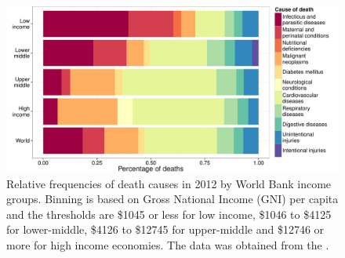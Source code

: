 \begin{knitrout}
\color{fgcolor}\begin{figure}
\includegraphics[width=\maxwidth]{figures/R/who-deaths/topCauses-who-deaths_top-causes-1} \caption[Relative frequencies of death causes in 2012 by World Bank income groups]{Relative frequencies of death causes in 2012 by World Bank income groups. Binning is based on Gross National Income (GNI) per capita and the thresholds are \$1045 or less for low income, \$1046 to \$4125 for lower-middle, \$4126 to \$12745 for upper-middle and \$12746 or more for high income economies. The data was obtained from the \cite{WHO2012}.}\label{fig:who-deaths_top-causes}
\end{figure}


\end{knitrout}

\newcommand{\knitrTotalDeathsTwelve}{58.3 million}

\newcommand{\knitrPercentageDeathsTwelveHigh}{20.1\%}
\newcommand{\knitrPercentageDeathsTwelveLow}{14\%}
\newcommand{\knitrPercentageDeathsTwelveLmid}{36.5\%}
\newcommand{\knitrPercentageDeathsTwelveUmid}{29.4\%}

\newcommand{\knitrPercentDeathsTwelveLowInfect}{39.6\%}
\newcommand{\knitrPercentDeathsTwelveLowPerinat}{20.8\%}
\newcommand{\knitrPercentDeathsTwelveLmidInfect}{23.3\%}
\newcommand{\knitrPercentDeathsTwelveLmidCardio}{26.5\%}
\newcommand{\knitrPercentDeathsTwelveUmidInfect}{8.5\%}
\newcommand{\knitrPercentDeathsTwelveHighInfect}{6.7\%}
\newcommand{\knitrPercentDeathsTwelveWorldInfect}{18.3\%}
\newcommand{\knitrPercentDeathsTwelveWorldCardio}{33.7\%}
\newcommand{\knitrPercentDeathsTwelveWorldCancer}{15.8\%}
